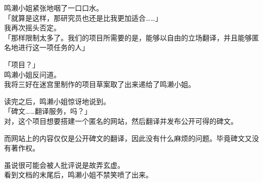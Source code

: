 鸣濑小姐紧张地咽了一口口水。\\

「就算是这样，那研究员也还是比我更加适合……」\\

我再次摇头否定。\\

「那样限制太多了。我们的项目所需要的是，能够以自由的立场翻译，并且能够匿名地进行这一项任务的人」

「项目？」\\

鸣濑小姐反问道。\\

我将三好在迷宫里制作的项目草案取了出来递给了鸣濑小姐。

读完之后，鸣濑小姐惊讶地说到。\\

「碑文……翻译服务，吗？」\\

对，这个项目想要搭建一个匿名的网站，然后翻译并发布公开可得的碑文。

而网站上的内容仅仅是公开碑文的翻译，因此没有什么麻烦的问题。毕竟碑文又没有著作权。

虽说很可能会被人批评说是故弄玄虚。\\

看到文档的末尾后，鸣濑小姐不禁笑喷了出来。\\

